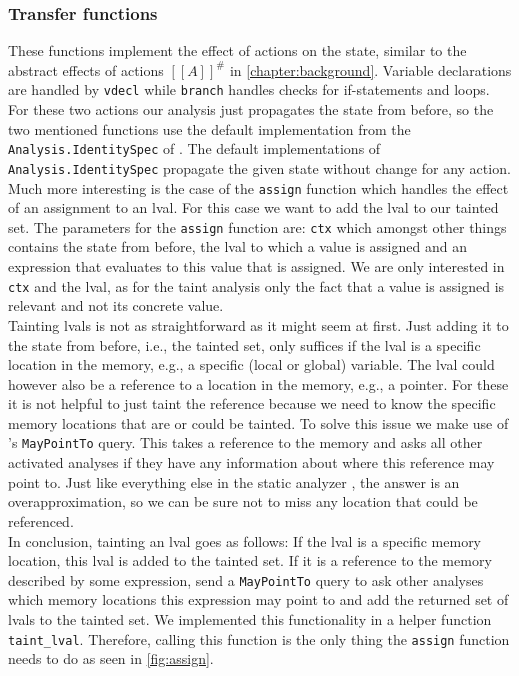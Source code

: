       \subsubsection{Transfer functions}
        These functions implement the effect of actions on the state, similar to the abstract effects of actions $[\![A]\!]^{\#}$ in \autoref{chapter:background}. Variable declarations are handled by \texttt{vdecl} while \texttt{branch} handles checks for if-statements and loops. For these two actions our analysis just propagates the state from before, so the two mentioned functions use the default implementation from the \texttt{Analysis.IdentitySpec} of \gob. The default implementations of \texttt{Analysis.IdentitySpec} propagate the given state without change for any action.\\
        Much more interesting is the case of the \texttt{assign} function which handles the effect of an assignment to an \ac{lval}. For this case we want to add the \ac{lval} to our tainted set. The parameters for the \texttt{assign} function are: \texttt{ctx} which amongst other things contains the state from before, the \ac{lval} to which a value is assigned and an expression that evaluates to this value that is assigned. We are only interested in \texttt{ctx} and the \ac{lval}, as for the taint analysis only the fact that a value is assigned is relevant and not its concrete value.\\
        Tainting \ac{lval}s is not as straightforward as it might seem at first. Just adding it to the state from before, i.e., the tainted set, only suffices if the \ac{lval} is a specific location in the memory, e.g., a specific (local or global) variable. The \ac{lval} could however also be a reference to a location in the memory, e.g., a pointer. For these it is not helpful to just taint the reference because we need to know the specific memory locations that are or could be tainted. To solve this issue we make use of \gob's \texttt{MayPointTo} query. This takes a reference to the memory and asks all other activated analyses if they have any information about where this reference may point to. Just like everything else in the static analyzer \gob, the answer is an overapproximation, so we can be sure not to miss any location that could be referenced.\\
        In conclusion, tainting an \ac{lval} goes as follows: If the \ac{lval} is a specific memory location, this \ac{lval} is added to the tainted set. If it is a reference to the memory described by some expression, send a \texttt{MayPointTo} query to ask other analyses which memory locations this expression may point to and add the returned set of \ac{lval}s to the tainted set. We implemented this functionality in a helper function \texttt{taint\_lval}. Therefore, calling this function is the only thing the \texttt{assign} function needs to do as seen in \autoref{fig:assign}.

